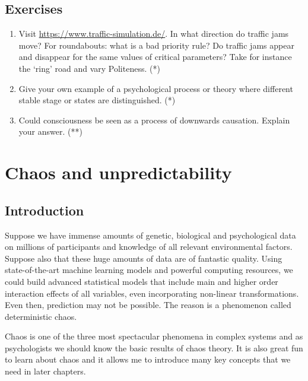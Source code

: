 \documentclass[
  a4paper,
  DIV=11,
  numbers=noendperiod,
  oneside]{scrreprt}
\begin{document}
\hypertarget{sec-Exercises}{%
\section{Exercises}\label{sec-Exercises}}

\begin{enumerate}
\def\labelenumi{\arabic{enumi})}
\item
  Visit \url{https://www.traffic-simulation.de/}. In what direction do
  traffic jams move? For roundabouts: what is a bad priority rule? Do
  traffic jams appear and disappear for the same values of critical
  parameters? Take for instance the `ring' road and vary Politeness. (*)
\item
  Give your own example of a psychological process or theory where
  different stable stage or states are distinguished. (*)
\item
  Could consciousness be seen as a process of downwards causation.
  Explain your answer. (**)
\end{enumerate}


\hypertarget{sec-ch2}{%
\chapter{Chaos and unpredictability}\label{sec-ch2}}

\hypertarget{sec-Introduction}{%
\section{Introduction}\label{sec-Introduction}}

Suppose we have immense amounts of genetic, biological and psychological
data on millions of participants and knowledge of all relevant
environmental factors. Suppose also that these huge amounts of data are
of fantastic quality. Using state-of-the-art machine learning models and
powerful computing resources, we could build advanced statistical models
that include main and higher order interaction effects of all variables,
even incorporating non-linear transformations. Even then, prediction may
not be possible. The reason is a phenomenon called deterministic chaos.

Chaos is one of the three most spectacular phenomena in complex systems
and as psychologists we should know the basic results of chaos theory.
It is also great fun to learn about chaos and it allows me to introduce
many key concepts that we need in later chapters.
\end{document}
